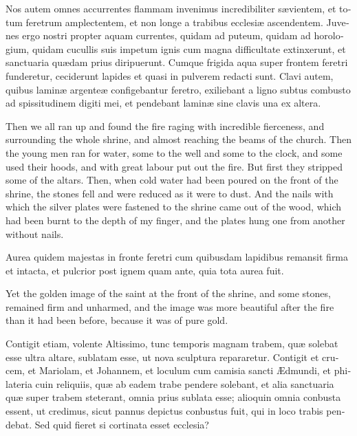\documentclass{book}
\begin{document}
\begin{paracol}{2}
\switchcolumn*

\begin{otherlanguage}{latin}
Nos autem omnes accurrentes flammam invenimus incredibiliter s\ae{}vientem, et totum feretrum amplectentem, et non longe a trabibus ecclesi\ae{} ascendentem. Juvenes ergo nostri propter aquam currentes, quidam ad puteum, quidam ad horologium, quidam cucullis suis impetum ignis cum magna difficultate extinxerunt, et sanctuaria qu\ae{}dam prius diripuerunt. Cumque frigida aqua super frontem feretri funderetur, ceciderunt lapides et quasi in pulverem redacti sunt. Clavi autem, quibus lamin\ae{} argente\ae{} configebantur feretro, exiliebant a ligno subtus combusto ad spissitudinem digiti mei, et pendebant lamin\ae{} sine clavis una ex altera. 
\end{otherlanguage}

\switchcolumn

Then we all ran up and found the fire raging with incredible fierceness, and surrounding the whole shrine, and almost reaching the beams of the church. Then the young men ran for water, some to the well and some to the clock, and some used their hoods, and with great labour put out the fire. But first they stripped some of the altars. Then, when cold water had been poured on the front of the shrine, the stones fell and were reduced as it were to dust. And the nails with which the silver plates were fastened to the shrine came out of the wood, which had been burnt to the depth of my finger, and the plates hung one from another without nails.

\switchcolumn*

\begin{otherlanguage}{latin}
Aurea quidem majestas in fronte feretri cum quibusdam lapidibus remansit firma et intacta, et pulcrior post ignem quam ante, quia tota aurea fuit.
\end{otherlanguage}

\switchcolumn

Yet the golden image of the saint at the front of the shrine, and some stones, remained firm and unharmed, and the image was more beautiful after the fire than it had been before, because it was of pure gold.

\switchcolumn*

\begin{otherlanguage}{latin}
Contigit etiam, volente Altissimo, tunc temporis magnam trabem, qu\ae{} solebat esse ultra altare, sublatam esse, ut nova sculptura repararetur. Contigit et crucem, et Mariolam, et Johannem, et loculum cum camisia sancti \AE{}dmundi, et philateria cuin reliquiis, qu\ae{} ab eadem trabe pendere solebant, et alia sanctuaria qu\ae{} super trabem steterant, omnia prius sublata esse; alioquin omnia conbusta essent, ut credimus, sicut pannus depictus conbustus fuit, qui in loco trabis pendebat. Sed quid fieret si cortinata esset ecclesia? 
\end{otherlanguage}


\end{paracol}
\end{document}
